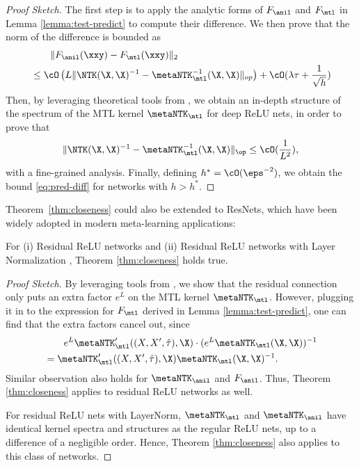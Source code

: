 \documentclass{article}
\begin{document}
\begin{proof}[Proof Sketch]
The first step is to apply the analytic forms of $F_\anil$ and $F_\mtl$ in Lemma \ref{lemma:test-predict} to compute their difference. We then prove that the norm of the difference is bounded as
\begin{align*}
& \qquad \|F_\anil(\xxy) - F_\mtl(\xxy) \|_{2} \\
&\leq\cO\left(L \|\NTK(\X,\X)^{-1} - \metaNTK_\mtl^{-1}(\X,\X)\|_{op}\right) + \cO(\lambda \tau+\frac{1}{\sqrt h})
\end{align*}
Then, by leveraging theoretical tools from \citet{xiao2020dis}, we obtain an in-depth structure of the spectrum of the MTL kernel $\metaNTK_\mtl$ for deep ReLU nets, in order to prove that $$ \|\NTK(\X,\X)^{-1} - \metaNTK_\mtl^{-1}(\X,\X)\|_{\op} \leq \cO(\frac {1}{L^2}),$$ with a fine-grained analysis. Finally, defining $h^* = \cO(\eps^{-2})$, we obtain the bound \eqref{eq:pred-diff} for networks with $h > h^*$.
\end{proof}

Theorem~\ref{thm:closeness} could also be extended to ResNets, which have been widely adopted in modern meta-learning applications:
\begin{corollary}\label{corollary:resnets}
\vspace{-1.0em}
For (i) Residual ReLU networks \cite{resnet} and (ii) Residual ReLU networks with Layer Normalization \cite{layernorm}, Theorem \ref{thm:closeness} holds true.
\vspace{-0.5em}
\end{corollary}
\begin{proof}[Proof Sketch]
By leveraging tools from \citet{xiao2020dis}, we show that the residual connection only puts an extra factor $e^L$ on the MTL kernel $\metaNTK_\mtl$. However, plugging it in to the expression for $F_\mtl$ derived in Lemma \ref{lemma:test-predict}, one can find that the extra factors cancel out, since
\begin{align*}
&\qquad e^{L}\metaNTK_\mtl'((X,X',\hat\tau),\X) \cdot (e^{L} \metaNTK_\mtl(\X,\X))^{-1}\\ &=\metaNTK_\mtl'((X,X',\hat\tau),\X)  \metaNTK_\mtl(\X,\X)^{-1}.    
\end{align*}
Similar observation also holds for $\metaNTK_\anil$ and $F_\anil$. Thus, Theorem \ref{thm:closeness} applies to residual ReLU networks as well.

For residual ReLU nets with LayerNorm, $\metaNTK_\mtl$ and $\metaNTK_\anil$ have identical kernel spectra and structures as the regular ReLU nets, up to a difference of a negligible order. Hence, Theorem \ref{thm:closeness} also applies to this class of networks.
\end{proof}
\end{document}
